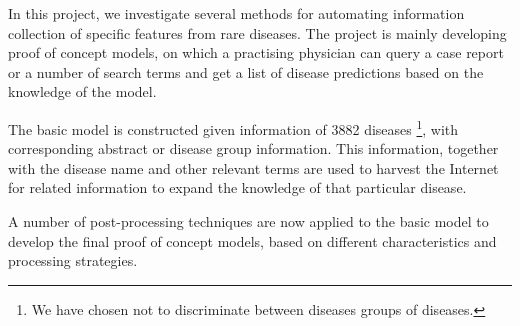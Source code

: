 \documentclass[10pt,letterpaper,final]{article}
\begin{document}

In this project, we investigate several methods for automating
information collection of specific features from rare diseases. The
project is mainly developing proof of concept models, on which a
practising physician can query a case report or a number of search terms
and get a list of disease predictions based on the knowledge of the
model.

The basic model is constructed given information of 3882 diseases
\footnote{We have chosen not to discriminate between diseases groups of
diseases.}, with corresponding abstract or disease group information.
This information, together with the disease name and other relevant
terms are used to harvest the Internet for related information to expand
the knowledge of that particular disease.

A number of post-processing techniques are now applied to the basic
model to develop the final proof of concept models, based on different
characteristics and processing strategies.




\end{document}
